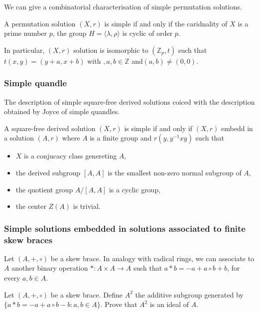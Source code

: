 We can give a combinatorial characterisation of simple permutation solutions.

\begin{proposition}
    A permutation solution $(X,r)$ is simple if and only if the caridnality of $X$ is a prime number $p$, the group $H=\langle\lambda,\rho\rangle$ is cyclic of order $p$.

    In particular, $(X,r)$ solution is isomorphic to $(\mathbb{Z}_p,t)$ such that $t(x,y)= (y+a,x+b)$ with $,a,b\in \mathbb{Z}$ and$(a,b)\neq (0,0)$.
\end{proposition}

\subsubsection{Simple quandle}

The description of simple square-free derived solutions coiced with the description obtained by Joyce of simple quandles. 

\begin{proposition}
    A square-free derived solution $(X,r)$ is simple if and only if $(X,r)$ embedd in a solution $(A,r)$ where $A$ is a finite group and $r(y, y^{-1}xy)$ such that
    \begin{itemize}
        \item $X$ is a conjucacy class genereting $A$,
        \item the derived subgroup $[A,A]$ is the smallest non-zero normal subgroup of $A$,
        \item the quotient group $A/[A,A]$ is a cyclic group,
        \item the center $Z(A)$ is trivial.
    \end{itemize}
\end{proposition}

\subsubsection{Simple solutions embedded in solutions associated to finite skew braces}

Let $(A,+,\circ)$ be a skew brace. In analogy with radical rings, we can associate to $A$ another binary operation $\ast:A\times A\to A$ such that $a\ast b = -a+a\circ b +b$, for every $a,b\in A$.

\begin{exercise}\label{ex:A2}
    Let $(A,+,\circ)$ be a skew brace. Define $A^2$ the additive subgroup generated by $\{a\ast b=-a+a\circ b - b \colon a,b\in A\}$. Prove that 
    $A^2$ is an ideal of $A$.
\end{exercise}

